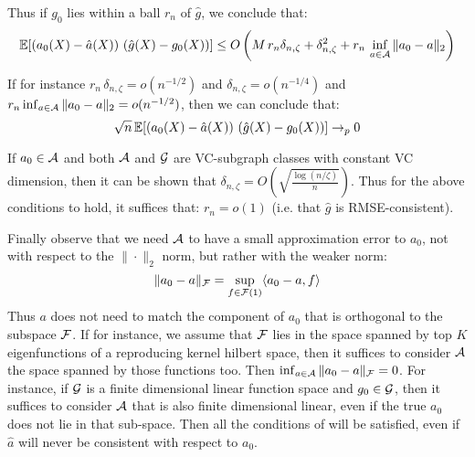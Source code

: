 Thus if $g_0$ lies within a ball $r_n$ of $\hat{g}$, we conclude that:
\begin{equation}
    \mathbb{E}[(a_0(X) - \hat{a}(X))\, \left(\hat{g}(X) - g_0(X)\right)] \leq O\left(M\, r_n \delta_{n,\zeta} + \delta_{n,\zeta}^2 + r_n\, \inf_{a\in {\mathcal A}}\|a_0 - a\|_2\right)
\end{equation}

If for instance $r_n\, \delta_{n,\zeta} = o(n^{-1/2})$ and $\delta_{n,\zeta} = o(n^{-1/4})$ and $r_n\inf_{a\in {\mathcal A}}\|a_0 - a\|_2 = o(n^{-1/2})$, then we can conclude that:
\begin{equation}
    \sqrt{n}\, \mathbb{E}[(a_0(X) - \hat{a}(X))\, \left(\hat{g}(X) - g_0(X)\right)] \to_p 0
\end{equation}

If $a_0 \in {\mathcal A}$ and both ${\mathcal A}$ and ${\mathcal G}$ are VC-subgraph classes with constant VC dimension, then it can be shown that $\delta_{n,\zeta}=O\left(\sqrt{\frac{\log(n/\zeta)}{n}}\right)$. Thus for the above conditions to hold, it suffices that: $r_n = o(1)$ (i.e. that $\hat{g}$ is RMSE-consistent).

Finally observe that we need ${\mathcal A}$ to have a small approximation error to $a_0$, not with respect to the $\|\cdot\|_2$ norm, but rather with the weaker norm:
\begin{equation}
    \|a_0 - a\|_{{\mathcal F}} = \sup_{f\in {\mathcal F}(1)}  \langle a_0 - a, f \rangle
\end{equation}
Thus $a$ does not need to match the component of $a_0$ that is orthogonal to the subspace ${\mathcal F}$. If for instance, we assume that ${\mathcal F}$ lies in the space spanned by top $K$ eigenfunctions of a reproducing kernel hilbert space, then it suffices to consider ${\mathcal A}$ the space spanned by those functions too. Then $\inf_{a\in {\mathcal A}} \|a_0 - a\|_{{\mathcal F}}=0$. For instance, if ${\mathcal G}$ is a finite dimensional linear function space and $g_0\in {\mathcal G}$, then it suffices to consider ${\mathcal A}$ that is also finite dimensional linear, even if the true $a_0$ does not lie in that sub-space. Then all the conditions of  will be satisfied, even if $\hat{a}$ will never be consistent with respect to $a_0$.
